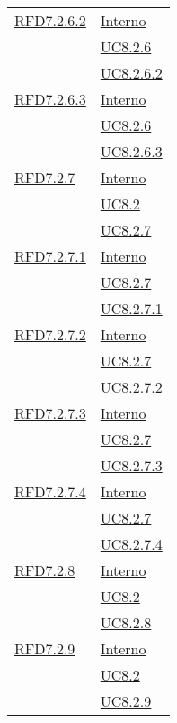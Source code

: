 \begin{longtable}{|>{\centering}m{5cm}|m{5cm}<{\centering}|}
\hyperlink{RFD7.2.6.2}{RFD7.2.6.2} & \hyperlink{Interno}{Interno}\\
& \hyperref[UC8.2.6]{UC8.2.6}\\
& \hyperref[UC8.2.6.2]{UC8.2.6.2}\\ \hline

\hyperlink{RFD7.2.6.3}{RFD7.2.6.3} & \hyperlink{Interno}{Interno}\\
& \hyperref[UC8.2.6]{UC8.2.6}\\
& \hyperref[UC8.2.6.3]{UC8.2.6.3}\\ \hline

\hyperlink{RFD7.2.7}{RFD7.2.7} & \hyperlink{Interno}{Interno}\\
& \hyperref[UC8.2]{UC8.2}\\
& \hyperref[UC8.2.7]{UC8.2.7}\\ \hline

\hyperlink{RFD7.2.7.1}{RFD7.2.7.1} & \hyperlink{Interno}{Interno}\\
& \hyperref[UC8.2.7]{UC8.2.7}\\
& \hyperref[UC8.2.7.1]{UC8.2.7.1}\\ \hline

\hyperlink{RFD7.2.7.2}{RFD7.2.7.2} & \hyperlink{Interno}{Interno}\\
& \hyperref[UC8.2.7]{UC8.2.7}\\
& \hyperref[UC8.2.7.2]{UC8.2.7.2}\\ \hline

\hyperlink{RFD7.2.7.3}{RFD7.2.7.3} & \hyperlink{Interno}{Interno}\\
& \hyperref[UC8.2.7]{UC8.2.7}\\
& \hyperref[UC8.2.7.3]{UC8.2.7.3}\\ \hline

\hyperlink{RFD7.2.7.4}{RFD7.2.7.4} & \hyperlink{Interno}{Interno}\\
& \hyperref[UC8.2.7]{UC8.2.7}\\
& \hyperref[UC8.2.7.4]{UC8.2.7.4}\\ \hline

\hyperlink{RFD7.2.8}{RFD7.2.8} & \hyperlink{Interno}{Interno}\\
& \hyperref[UC8.2]{UC8.2}\\
& \hyperref[UC8.2.8]{UC8.2.8}\\ \hline

\hyperlink{RFD7.2.9}{RFD7.2.9} & \hyperlink{Interno}{Interno}\\
& \hyperref[UC8.2]{UC8.2}\\
& \hyperref[UC8.2.9]{UC8.2.9}\\ \hline


\end{longtable}
